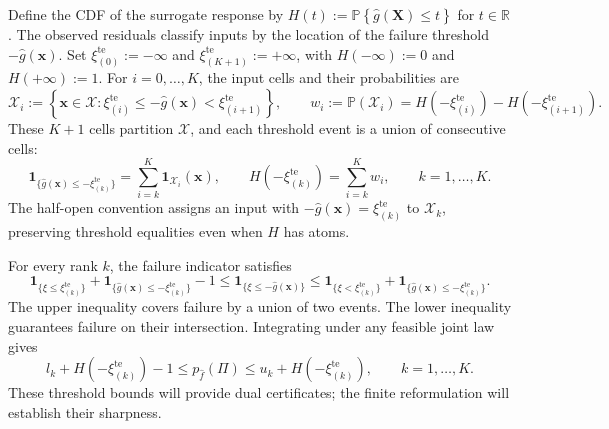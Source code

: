 \documentclass[review,11pt,3p,authoryear,nopreprintline]{elsarticle}
\begin{document}
Define the CDF of the surrogate response by $H(t):=\mathbb P\left\{\hat g(\bm X)\le t\right\}$ for $t\in\mathbb R$. The observed residuals classify inputs by the location of the failure threshold $-\hat g(\bm x)$. Set $\xi_{(0)}^{\mathrm{te}}:=-\infty$ and $\xi_{(K+1)}^{\mathrm{te}}:=+\infty$, with $H(-\infty):=0$ and $H(+\infty):=1$. For $i=0,\ldots,K$, the input cells and their probabilities are
\begin{equation}
  \mathcal X_i:=\left\{\bm x\in\mathcal X:
    \xi_{(i)}^{\mathrm{te}}\le-\hat g(\bm x)<\xi_{(i+1)}^{\mathrm{te}}\right\},
  \qquad
  w_i:=\mathbb P(\mathcal X_i)
    =H\left(-\xi_{(i)}^{\mathrm{te}}\right)-H\left(-\xi_{(i+1)}^{\mathrm{te}}\right).
  \label{eq-input-cells}
\end{equation}
These $K+1$ cells partition $\mathcal X$, and each threshold event is a union of consecutive cells:
\[
  \mathbf1_{\{\hat g(\bm x)\le-\xi_{(k)}^{\mathrm{te}}\}}
    =\sum_{i=k}^K\mathbf1_{\mathcal X_i}(\bm x),
  \qquad
  H\left(-\xi_{(k)}^{\mathrm{te}}\right)=\sum_{i=k}^K w_i,
  \qquad k=1,\ldots,K.
\]
The half-open convention assigns an input with $-\hat g(\bm x)=\xi_{(k)}^{\mathrm{te}}$ to $\mathcal X_k$, preserving threshold equalities even when $H$ has atoms.

For every rank $k$, the failure indicator satisfies 
\[
  \mathbf1_{\{\xi\le\xi_{(k)}^{\mathrm{te}}\}}
    +\mathbf1_{\{\hat g(\bm x)\le-\xi_{(k)}^{\mathrm{te}}\}}-1
  \le\mathbf1_{\{\xi\le-\hat g(\bm x)\}}
  \le\mathbf1_{\{\xi<\xi_{(k)}^{\mathrm{te}}\}}
    +\mathbf1_{\{\hat g(\bm x)\le-\xi_{(k)}^{\mathrm{te}}\}}.
\]
The upper inequality covers failure by a union of two events. The lower inequality guarantees failure on their intersection. Integrating under any feasible joint law gives
\begin{equation*}
  l_k+H\left(-\xi_{(k)}^{\mathrm{te}}\right)-1\le p_{\hat f}(\Pi)\le u_k+H\left(-\xi_{(k)}^{\mathrm{te}}\right),
  \qquad k=1,\ldots,K.
\end{equation*}
These threshold bounds will provide dual certificates; the finite reformulation will establish their sharpness.
\end{document}
